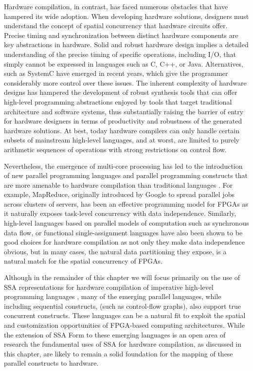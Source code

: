 Hardware compilation, in contrast, has faced numerous obstacles that have hampered its wide adoption. When developing hardware solutions, designers must understand the concept of spatial concurrency that hardware circuits offer. 
Precise timing and synchronization between distinct hardware components are key abstractions in hardware. 
Solid and robust hardware design implies a detailed understanding of the precise timing of specific operations, including I/O, that simply cannot be expressed in languages such as C, C++, or Java. Alternatives, such as SystemC have emerged in recent years, which give the programmer considerably more control over these issues. 
The inherent complexity of hardware designs has hampered the development of robust synthesis tools that can offer high-level programming abstractions enjoyed by tools that target traditional architecture and software systems, thus substantially raising the barrier of entry for hardware designers in terms of productivity and robustness of the generated hardware solutions. 
At best, today hardware compilers can only handle certain subsets of mainstream high-level languages, and at worst, are limited to purely arithmetic sequences of operations with strong restrictions on control flow.

Nevertheless, the emergence of multi-core processing has led to the introduction of new parallel programming languages and parallel programming constructs that are more amenable to hardware compilation than traditional languages .
For example, MapReduce\cite{Dean:CACM08}, originally introduced by Google to spread parallel jobs across clusters of servers, has been an effective programming model for FPGAs as it naturally exposes task-level concurrency with data independence. Similarly, high-level languages based on parallel models of computation such as synchronous data flow, or functional single-assignment languages have also been shown to be good choices for hardware compilation as not only they make data independence obvious, but in many cases,  the natural data partitioning they expose, is a natural match for the spatial concurrency of FPGAs.

Although in the remainder of this chapter we will focus primarily on the use of SSA representations for hardware compilation of imperative high-level programming languages , many of the emerging parallel languages, while including sequential constructs, (such as control-flow graphs), also support true concurrent constructs. These languages can be a natural fit to exploit the spatial and customization opportunities of FPGA-based computing architectures.
While the extension of SSA Form to these emerging languages is an open area of research the fundamental uses of SSA for hardware compilation, as discussed in this chapter, are likely to remain a solid foundation for the mapping of these parallel constructs to hardware.

